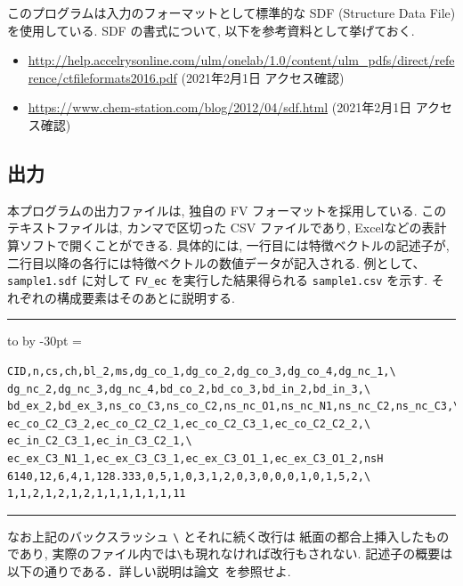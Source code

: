 \documentclass[11pt,titlepage,dvipdfmx,twoside]{jsbook}
\newenvironment{myframe}{\begin{trivlist}\item[]
    \hrule
    \hbox to \linewidth\bgroup
    \advance\linewidth by -30pt
    \hsize=\linewidth
    \vrule\hfill
    \vbox\bgroup
    \vskip15pt
    \def\thempfootnote{\arabic{mpfootnote}}
    \begin{minipage}{\linewidth}}{%
    \end{minipage}\vskip15pt
    \egroup\hfill\vrule
    \egroup\hrule
\end{trivlist}}
\begin{document}
このプログラムは入力のフォーマットとして標準的な SDF (Structure Data File) を使用している.
SDF の書式について, 以下を参考資料として挙げておく. 
\begin{itemize}
\item \url{http://help.accelrysonline.com/ulm/onelab/1.0/content/ulm_pdfs/direct/reference/ctfileformats2016.pdf} (2021年2月1日 アクセス確認)
\item \url{https://www.chem-station.com/blog/2012/04/sdf.html} (2021年2月1日 アクセス確認)
\end{itemize}



\subsection{出力}
本プログラムの出力ファイルは,
独自の FV フォーマットを採用している.
このテキストファイルは, カンマで区切った CSV ファイルであり,
Excelなどの表計算ソフトで開くことができる.
具体的には, 一行目には特徴ベクトルの記述子が,
二行目以降の各行には特徴ベクトルの数値データが記入される. 
例として、{\tt sample1.sdf} に対して {\tt FV\_ec} を実行した結果得られる
{\tt sample1.csv} を示す.
それぞれの構成要素はそのあとに説明する. 

\begin{myframe}
\begin{verbatim}
CID,n,cs,ch,bl_2,ms,dg_co_1,dg_co_2,dg_co_3,dg_co_4,dg_nc_1,\
dg_nc_2,dg_nc_3,dg_nc_4,bd_co_2,bd_co_3,bd_in_2,bd_in_3,\
bd_ex_2,bd_ex_3,ns_co_C3,ns_co_C2,ns_nc_O1,ns_nc_N1,ns_nc_C2,ns_nc_C3,\
ec_co_C2_C3_2,ec_co_C2_C2_1,ec_co_C2_C3_1,ec_co_C2_C2_2,\
ec_in_C2_C3_1,ec_in_C3_C2_1,\
ec_ex_C3_N1_1,ec_ex_C3_C3_1,ec_ex_C3_O1_1,ec_ex_C3_O1_2,nsH
6140,12,6,4,1,128.333,0,5,1,0,3,1,2,0,3,0,0,0,1,0,1,5,2,\
1,1,2,1,2,1,2,1,1,1,1,1,1,11
\end{verbatim}
\end{myframe}

なお上記のバックスラッシュ \verb|\| とそれに続く改行は
紙面の都合上挿入したものであり, 実際のファイル内では\verb|\|も現れなければ改行もされない. 
記述子の概要は以下の通りである．詳しい説明は論文~\cite{cyclic_BH_arxiv}を参照せよ.
\end{document}
